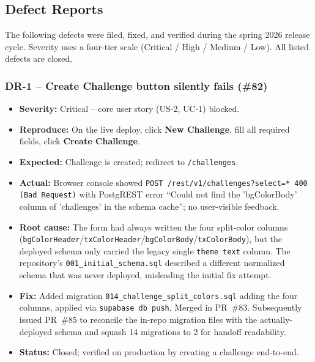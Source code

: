 \documentclass[11pt,letterpaper]{article}
\begin{document}
\subsection{Defect Reports}

The following defects were filed, fixed, and verified during
the spring 2026 release cycle. Severity uses a four-tier scale
(Critical / High / Medium / Low). All listed defects are
closed.

\subsubsection*{DR-1 -- Create Challenge button silently fails (\#82)}

\begin{itemize}[noitemsep]
  \item \textbf{Severity:} Critical -- core user story (US-2,
        UC-1) blocked.
  \item \textbf{Reproduce:} On the live deploy, click
        \textbf{New Challenge}, fill all required fields, click
        \textbf{Create Challenge}.
  \item \textbf{Expected:} Challenge is created; redirect to
        \texttt{/challenges}.
  \item \textbf{Actual:} Browser console showed
        \texttt{POST /rest/v1/challenges?select=* 400 (Bad
        Request)} with PostgREST error ``Could not find the
        'bgColorBody' column of 'challenges' in the schema
        cache''; no user-visible feedback.
  \item \textbf{Root cause:} The form had always written the
        four split-color columns
        (\texttt{bgColorHeader}/\texttt{txColorHeader}/\texttt{bgColorBody}/\texttt{txColorBody}),
        but the deployed schema only carried the legacy single
        \texttt{theme text} column. The repository's
        \texttt{001\_initial\_schema.sql} described a different
        normalized schema that was never deployed, misleading
        the initial fix attempt.
  \item \textbf{Fix:} Added migration
        \texttt{014\_challenge\_split\_colors.sql} adding the
        four columns, applied via \texttt{supabase db push}.
        Merged in PR~\#83. Subsequently issued PR~\#85 to
        reconcile the in-repo migration files with the
        actually-deployed schema and squash 14 migrations to
        2 for handoff readability.
  \item \textbf{Status:} Closed; verified on production by
        creating a challenge end-to-end.
\end{itemize}
\end{document}
